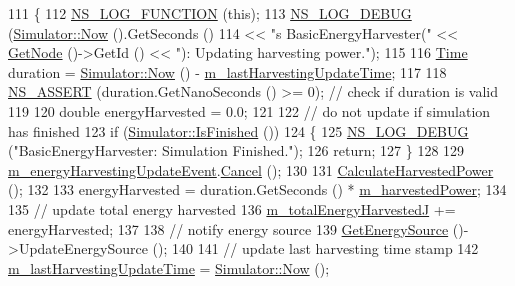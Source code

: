 \begin{DoxyCode}
111 \{
112   \hyperlink{log-macros-disabled_8h_a90b90d5bad1f39cb1b64923ea94c0761}{NS\_LOG\_FUNCTION} (\textcolor{keyword}{this});
113   \hyperlink{group__logging_ga413f1886406d49f59a6a0a89b77b4d0a}{NS\_LOG\_DEBUG} (\hyperlink{classns3_1_1Simulator_ac3178fa975b419f7875e7105be122800}{Simulator::Now} ().GetSeconds ()
114                 << \textcolor{stringliteral}{"s BasicEnergyHarvester("} << \hyperlink{classns3_1_1EnergyHarvester_a4ebe893a0fbb66d56ae8049155bb0e88}{GetNode} ()->GetId () << \textcolor{stringliteral}{"): Updating harvesting
       power."});
115 
116   \hyperlink{namespacens3_1_1TracedValueCallback_a7ffd3e7c142ffe7c8a1d2db9b8de38ec}{Time} duration = \hyperlink{classns3_1_1Simulator_ac3178fa975b419f7875e7105be122800}{Simulator::Now} () - 
      \hyperlink{classns3_1_1BasicEnergyHarvester_a05e614b07099c9b9708ba070ac32e109}{m\_lastHarvestingUpdateTime};
117 
118   \hyperlink{assert_8h_a6dccdb0de9b252f60088ce281c49d052}{NS\_ASSERT} (duration.GetNanoSeconds () >= 0); \textcolor{comment}{// check if duration is valid}
119 
120   \textcolor{keywordtype}{double} energyHarvested = 0.0;
121 
122   \textcolor{comment}{// do not update if simulation has finished}
123   \textcolor{keywordflow}{if} (\hyperlink{classns3_1_1Simulator_aa8c662d04480705d09b3d65b4dea9d2f}{Simulator::IsFinished} ())
124   \{
125     \hyperlink{group__logging_ga413f1886406d49f59a6a0a89b77b4d0a}{NS\_LOG\_DEBUG} (\textcolor{stringliteral}{"BasicEnergyHarvester: Simulation Finished."});
126     \textcolor{keywordflow}{return};
127   \}
128 
129   \hyperlink{classns3_1_1BasicEnergyHarvester_abb6206e5618287f67c20100848e617f8}{m\_energyHarvestingUpdateEvent}.\hyperlink{classns3_1_1EventId_a993ae94e48e014e1afd47edb16db7a11}{Cancel} ();
130 
131   \hyperlink{classns3_1_1BasicEnergyHarvester_ad48bc7cd5f890783a23bdc64d38704d3}{CalculateHarvestedPower} ();
132 
133   energyHarvested = duration.GetSeconds () * \hyperlink{classns3_1_1BasicEnergyHarvester_a0ba39c8a284e81584ab5af5ccdc3e898}{m\_harvestedPower};
134 
135   \textcolor{comment}{// update total energy harvested}
136   \hyperlink{classns3_1_1BasicEnergyHarvester_a87500c5e34a0f4cf246b20bd7b25a3d0}{m\_totalEnergyHarvestedJ} += energyHarvested;
137 
138   \textcolor{comment}{// notify energy source}
139   \hyperlink{classns3_1_1EnergyHarvester_a95d3d3f4d83d3bb33268f0abfd166f58}{GetEnergySource} ()->UpdateEnergySource ();
140 
141   \textcolor{comment}{// update last harvesting time stamp}
142   \hyperlink{classns3_1_1BasicEnergyHarvester_a05e614b07099c9b9708ba070ac32e109}{m\_lastHarvestingUpdateTime} = \hyperlink{classns3_1_1Simulator_ac3178fa975b419f7875e7105be122800}{Simulator::Now} ();

\end{DoxyCode}
